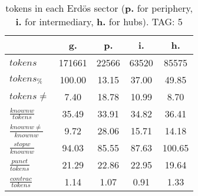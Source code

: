 \begin{table}[h!]
\begin{center}
\begin{tabular}{| l || c | c | c | c |}\hline
 & {\bf g.} & {\bf p.} & {\bf i.} & {\bf h.} \\\hline\hline
$tokens$ & 171661  & 22566  & 63520  & 85575 \\
$tokens_{\%}$ & 100.00  & 13.15  & 37.00  & 49.85 \\
$tokens \neq$ & 7.40  & 18.78  & 10.99  & 8.70 \\\hline
$\frac{knownw}{tokens}$ & 35.49  & 33.91  & 34.82  & 36.41 \\
$\frac{knownw \neq}{knownw}$ & 9.72  & 28.06  & 15.71  & 14.18 \\\hline
$\frac{stopw}{knownw}$ & 94.03  & 85.55  & 87.63  & 100.65 \\
$\frac{punct}{tokens}$ & 21.29  & 22.86  & 22.95  & 19.64 \\
$\frac{contrac}{tokens}$ & 1.14  & 1.07  & 0.91  & 1.33 \\\hline
\end{tabular}
\caption{tokens in each Erd\"os sector ({{\bf p.}} for periphery, {{\bf i.}} for intermediary, 
    {{\bf h.}} for hubs). TAG: 5}
\end{center}
\end{table}